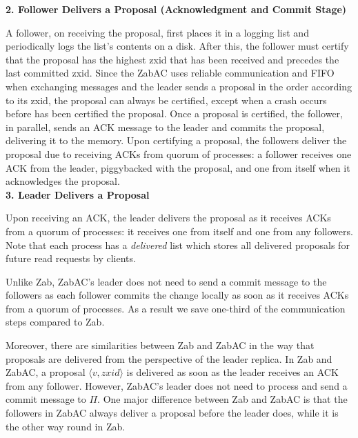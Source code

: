 \documentclass[a4paper,UKenglish]{oasics-v2016}
\begin{document}
\noindent \textbf{\small 2. Follower Delivers a Proposal (Acknowledgment and Commit Stage)}

\noindent A follower, on receiving the proposal, first places it in a logging list and periodically logs the list's contents on a disk. After this, the follower must certify that the proposal has the highest zxid that has been received and precedes the last committed zxid. Since the ZabAC uses reliable communication
and FIFO when exchanging messages and the leader sends a proposal in the order according to its zxid, the proposal can always be certified, except when a crash occurs before has been certified the proposal. Once a proposal
is certified, the follower, in parallel, sends an ACK
message to the leader and commits the proposal,
delivering it to the memory. Upon certifying a proposal, the followers deliver the proposal due to receiving ACKs from quorum
of processes: a follower receives one ACK from the leader, piggybacked with
the proposal, and one from itself when it acknowledges the proposal.\\

\noindent \textbf{\small 3. Leader Delivers a Proposal}

\noindent Upon receiving an ACK, the leader delivers the proposal as it receives ACKs from a quorum of processes: it receives one from itself and one from any followers. Note that each process has a \emph{delivered} list which stores all delivered proposals for future read requests by clients. 

\noindent Unlike Zab, ZabAC's leader does not need to send a commit message
to the followers as each follower commits the change locally as soon as it receives ACKs from a quorum of processes. As a
result we save one-third of the communication steps compared to Zab.

Moreover, there are similarities between Zab and ZabAC in the way that proposals are delivered from the perspective of the leader replica. In Zab and ZabAC, a proposal $\langle v,zxid\rangle$ is delivered
as soon as the leader receives an ACK from any follower. However,
ZabAC's leader does not need to process and send a commit message
to $\Pi$. One major difference between Zab and ZabAC is that the followers in ZabAC always deliver a proposal before the leader does, while it is the other way round in Zab. 

\end{document}
